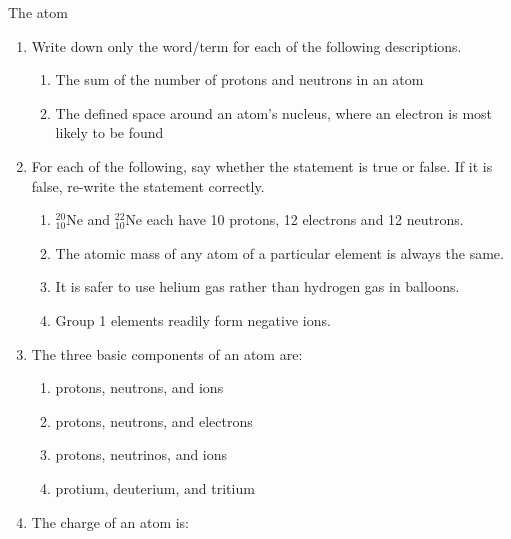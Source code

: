 \begin{eocexercises}{The atom}
            \nopagebreak \noindent
      \label{m38741*id263110}\begin{enumerate}[noitemsep, label=\textbf{\arabic*}. ] 
\label{m38741*uid189}\item Write down only the word/term for each of the following descriptions.
\label{m38741*id263126}\begin{enumerate}[noitemsep, label=\textbf{\alph*}. ] 
            \label{m38741*uid190}\item The sum of the number of protons and neutrons in an atom
\label{m38741*uid191}\item The defined space around an atom's nucleus, where an electron is most likely to be found
\end{enumerate}
                \label{m38741*uid192}\item For each of the following, say whether the statement is true or false. If it is false, re-write the statement correctly.
\label{m38741*id263169}\begin{enumerate}[noitemsep, label=\textbf{\alph*}. ] 
            \label{m38741*uid193}\item $_{10}^{20}\text{Ne}$ and $_{10}^{22}\text{Ne}$ each have 10 protons, 12 electrons and 12 neutrons.
\label{m38741*uid194}\item The atomic mass of any atom of a particular element is always the same.
\label{m38741*uid195}\item It is safer to use helium gas rather than hydrogen gas in balloons.
\label{m38741*uid196}\item Group 1 elements readily form negative ions.
\end{enumerate}
 \label{m38741*uid198}\item The three basic components of an atom are:
\label{m38741*id263289}\begin{enumerate}[noitemsep, label=\textbf{\alph*}. ] 
            \label{m38741*uid199}\item protons, neutrons, and ions
\label{m38741*uid200}\item protons, neutrons, and electrons
\label{m38741*uid201}\item protons, neutrinos, and ions
\label{m38741*uid202}\item protium, deuterium, and tritium
\end{enumerate}
                \label{m38741*uid203}\item The charge of an atom is:

\end{enumerate}
\end{eocexercises}

